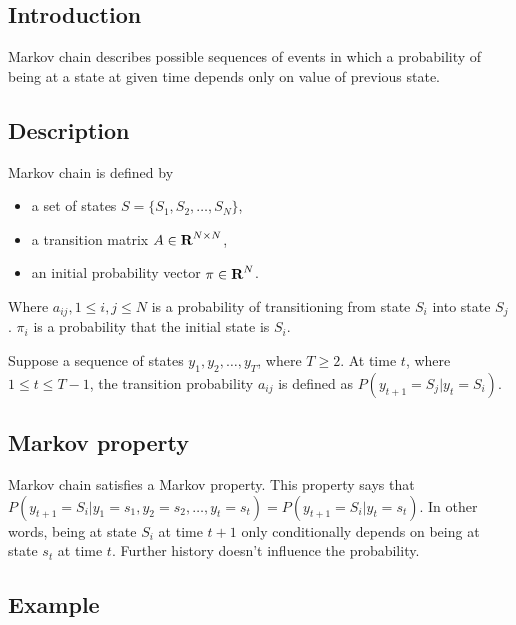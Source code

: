 \documentclass[thesis=B,english]{FITthesis}[2012/06/26]
\begin{document}
\subsection{Introduction}
Markov chain describes possible sequences of events in which a probability of being at a state at given time depends only on value of previous state. 

\subsection{Description}

Markov chain is defined by

\begin{itemize}
\item a set of states $S = \{S_1, S_2, \dots, S_N\}$,
\item a transition matrix $A \in \textbf R^{N \times N}$,
\item an initial probability vector $\pi \in \textbf R^N$.
\end{itemize}

Where $a_{ij}, 1 \leq i,j \leq N$ is a probability of transitioning from state $S_i$ into state $S_j$. $\pi_i$ is a probability that the initial state is $S_i$.

Suppose a sequence of states $y_1, y_2, \dots, y_T$, where $T \geq 2$. At time $t$, where $1 \leq t \leq T-1$, the transition probability $a_{ij}$ is defined as $P(y_{t+1}=S_j | y_t=S_i)$.

\subsection{Markov property}
Markov chain satisfies a Markov property. This property says that $P(y_{t+1}=S_i|y_1=s_1,y_2=s_2,\dots,y_t=s_t) = P(y_{t+1}=S_{i}|y_t=s_t)$. In other words, being at state $S_i$ at time $t+1$ only conditionally depends on being at state $s_t$ at time $t$. Further history doesn't influence the probability.

\subsection{Example}
\end{document}
